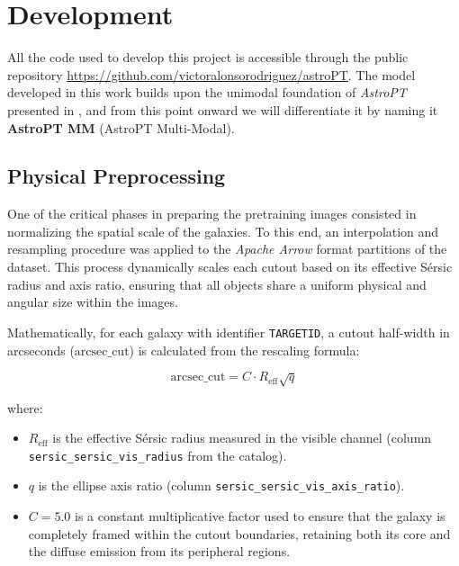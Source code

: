 
\section{Development} \label{sec:dev}

All the code used to develop this project is accessible through the public repository \url{https://github.com/victoralonsorodriguez/astroPT}. The model developed in this work builds upon the unimodal foundation of \textit{AstroPT} presented in \textcite{ar:astropt}, and from this point onward we will differentiate it by naming it \textbf{AstroPT MM} (AstroPT Multi-Modal).

\subsection{Physical Preprocessing}\label{sec:dev:inter}

One of the critical phases in preparing the pretraining images consisted in normalizing the spatial scale of the galaxies. To this end, an interpolation and resampling procedure was applied to the \textit{Apache Arrow} format partitions of the dataset. This process dynamically scales each cutout based on its effective Sérsic radius and axis ratio, ensuring that all objects share a uniform physical and angular size within the images.

Mathematically, for each galaxy with identifier \texttt{TARGETID}, a cutout half-width in arcseconds ($\text{arcsec\_cut}$) is calculated from the rescaling formula:

\begin{equation}
\text{arcsec\_cut} = C \cdot R_{\text{eff}} \sqrt{q}
\label{eq:arcsec_cut}
\end{equation}

where:

\begin{itemize}
\item $R_{\text{eff}}$ is the effective Sérsic radius measured in the visible channel (column \texttt{sersic\_sersic\_vis\_radius} from the catalog).
\item $q$ is the ellipse axis ratio (column \texttt{sersic\_sersic\_vis\_axis\_ratio}).
\item $C = 5.0$ is a constant multiplicative factor used to ensure that the galaxy is completely framed within the cutout boundaries, retaining both its core and the diffuse emission from its peripheral regions.
\end{itemize}

